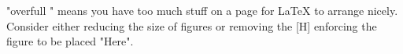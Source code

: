 "overfull \vbox" means you have too much stuff on a page for LaTeX to arrange nicely. Consider either reducing the size of figures or removing the [H] enforcing the figure to be placed "Here".